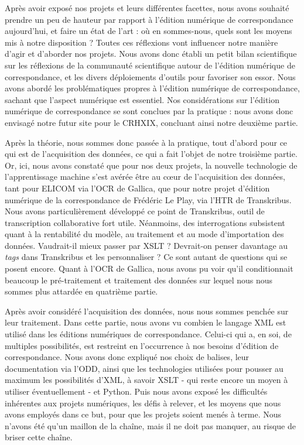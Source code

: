 Après avoir exposé nos projets et leurs différentes facettes, nous avons souhaité prendre un peu de hauteur par rapport à l'édition numérique de correspondance aujourd'hui, et faire un état de l'art : où en sommes-nous, quels sont les moyens mis à notre disposition ? 
Toutes ces réflexions vont influencer notre manière d'agir et d'aborder nos projets. Nous avons donc établi un petit bilan scientifique sur les réflexions de la communauté scientifique autour de l'édition numérique de correspondance, et les divers déploiements d'outils pour favoriser son essor. Nous avons abordé les problématiques propres à l'édition numérique de correspondance, sachant que l'aspect numérique est essentiel. 
Nos considérations sur l'édition numérique de correspondance se sont conclues par la pratique : nous avons donc envisagé notre futur site pour le CRHXIX, concluant ainsi notre deuxième partie.

Après la théorie, nous sommes donc passée à la pratique, tout d'abord pour ce qui est de l'acquisition des données, ce qui a fait l'objet de notre troisième partie. Or, ici, nous avons constaté que pour nos deux projets, la nouvelle technologie de l'apprentissage machine s'est avérée être au c\oe ur de l'acquisition des données, tant pour ELICOM via l'OCR de Gallica, que pour notre projet d'édition numérique de la correspondance de Frédéric Le Play, via l'HTR de Transkribus. Nous avons particulièrement développé ce point de Transkribus, outil de transcription collaborative fort utile. Néanmoins, des interrogations subsistent quant à la rentabilité du modèle, au traitement et au mode d'importation des données. Vaudrait-il mieux passer par XSLT ? Devrait-on penser davantage au \emph{tags} dans Transkribus et les personnaliser ? Ce sont autant de questions qui se posent encore. Quant à l'OCR de Gallica, nous avons pu voir qu'il conditionnait beaucoup le pré-traitement et traitement des données sur lequel nous nous sommes plus attardée en quatrième partie.

Après avoir considéré l'acquisition des données, nous nous sommes penchée sur leur traitement. Dans cette partie, nous avons vu combien le langage XML est utilisé dans les éditions numériques de correspondance. Celui-ci qui a, en soi, de multiples possibilités, est restreint en l'occurrence à nos besoins d'édition de correspondance. Nous avons donc expliqué nos choix de balises, leur documentation via l'ODD, ainsi que les technologies utilisées pour pousser au maximum les possibilités d'XML, à savoir XSLT - qui reste encore un moyen à utiliser éventuellement - et Python. Puis nous avons exposé les difficultés inhérentes aux projets numériques, les défis à relever, et les moyens que nous avons employés dans ce but, pour que les projets soient menés à terme. Nous n'avons été qu'un maillon de la chaîne, mais il ne doit pas manquer, au risque de briser cette chaîne.

